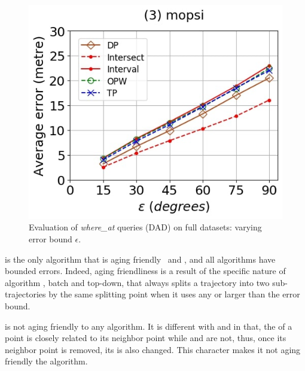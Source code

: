 {\begin{figure}[tb!]
	\includegraphics[scale = 0.250]{Figures/Exp-where-DAD-error-epsilon-mopsi.jpg}
	\vspace{-2ex}
	\caption{\small Evaluation of {\emph{where\_at}} queries (DAD) on full datasets: varying error bound $\epsilon$.}
	\label{fig:query-dad-epsilon}
	\vspace{-1.0ex}
\end{figure}


 \dpa is the only algorithm that is aging friendly \wrt ~\ped and \sed, {and all algorithms have bounded errors}. Indeed, {aging friendliness} is a result of the {specific nature} of algorithm \dpa, \ie batch and top-down, that always splits a trajectory into two sub-trajectories by the same splitting point when it uses any \ped or \sed larger than the error bound.

 \dad is not aging friendly \wrt to any algorithm. It is different with \ped and \sed in that, the \dad of a point is closely related to its neighbor point while \ped and \sed are not, thus, once its neighbor point is removed, its \dad is also changed. This character makes it not aging friendly \wrt the \dpa algorithm.
 	 	

}
